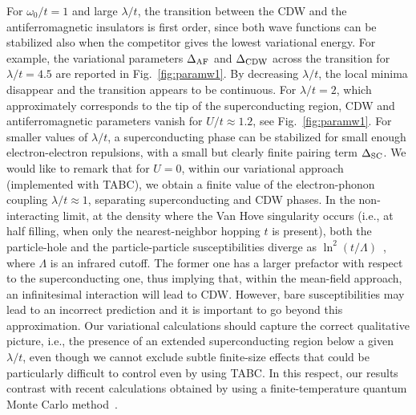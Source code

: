 \documentclass[aps,superscriptaddress,amsmath,amssymb,twocolumn,showpacs,floatfix,english]{revtex4}
\begin{document}
For $\omega_0/t=1$ and large $\lambda/t$, the transition between the CDW and the antiferromagnetic insulators is first order, since both 
wave functions can be stabilized also when the competitor gives the lowest variational energy. For example, the variational parameters 
$\Delta_{\rm AF}$ and $\Delta_{\rm CDW}$ across the transition for $\lambda/t=4.5$ are reported in Fig.~\ref{fig:paramw1}. By decreasing 
$\lambda/t$, the local minima disappear and the transition appears to be continuous. For $\lambda/t=2$, which approximately corresponds to 
the tip of the superconducting region, CDW and antiferromagnetic parameters vanish for $U/t \approx 1.2$, see Fig.~\ref{fig:paramw1}. For 
smaller values of $\lambda/t$, a superconducting phase can be stabilized for small enough electron-electron repulsions, with a small but
clearly finite pairing term $\Delta_{\rm SC}$. We would like to remark that for $U=0$, within our variational approach (implemented with 
TABC), we obtain a finite value of the electron-phonon coupling $\lambda/t \approx 1$, separating superconducting and CDW phases. In the
non-interacting limit, at the density where the Van Hove singularity occurs (i.e., at half filling, when only the nearest-neighbor hopping $t$ is present), both the 
particle-hole and the particle-particle susceptibilities diverge as $\ln^{2}(t/\Lambda)$~\cite{Hlubina1997}, where $\Lambda$ is an infrared 
cutoff. The former one has a larger prefactor with respect to the superconducting one, thus implying that, within the mean-field approach, 
an infinitesimal interaction will lead to CDW. However,  bare susceptibilities may lead to an incorrect prediction and it is 
important to go beyond this approximation. Our variational calculations should capture the correct qualitative picture, i.e., the presence 
of an extended superconducting region below a given $\lambda/t$, even though we cannot exclude subtle finite-size effects that could be 
particularly difficult to control even by using TABC. In this respect, our results contrast with recent calculations obtained by using a
finite-temperature quantum Monte Carlo method~\cite{Weber2017}.
\end{document}
